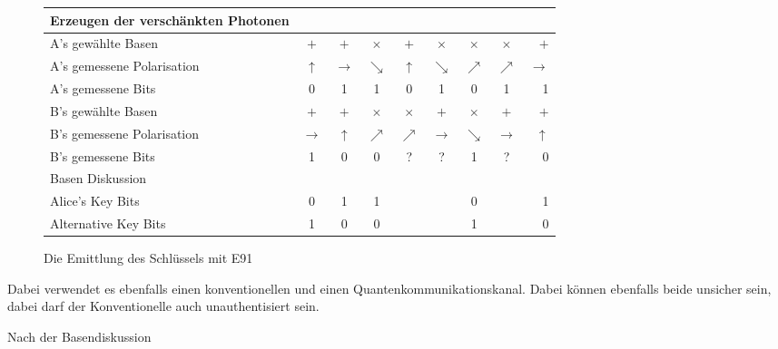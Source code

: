   \begin{figure}
  \centering
    \begin{tabular}{ l || c | c | c | c | c | c | c | r }
      \hline
      Erzeugen der versch\"ankten Photonen \\
      \hline
      A's gew\"ahlte Basen & $+$ & $+$ & $\times $ & $+$ & $\times $ & $\times $ & $\times $ & $+$ \\
      \hline
      A's gemessene Polarisation & $\uparrow$ & $\rightarrow$ & $\searrow$ & $\uparrow$ & $\searrow$ &     $\nearrow$ & $\nearrow$ & $\rightarrow$ \\
      \hline
      A's gemessene Bits & 0 & 1 & 1 & 0 & 1 & 0 & 1 & 1 \\
      \hline
      B's gew\"ahlte Basen & $+$ & $+$ & $\times $ & $\times $ & $+$ & $\times $ & $+$ & $+$ \\
      \hline
      B's gemessene Polarisation & $\rightarrow$ & $\uparrow$ & $\nearrow$ & $\nearrow$ & $\rightarrow$     & $\searrow$ & $\rightarrow$ & $\uparrow$ \\
      \hline
      B's gemessene Bits & 1 & 0 & 0 & ? & ? & 1 & ? & 0 \\
      \hline
      Basen Diskussion \\
      \hline
      Alice's Key Bits & 0 & 1 & 1 & & & 0 & & 1 \\
      Alternative Key Bits & 1 & 0 & 0 & & & 1 & & 0 \\
      \hline
    \end{tabular}
    \caption{Die Emittlung des Schl\"ussels mit E91 \label{crypto:tangtab}}
  \end{figure}

  Dabei verwendet es ebenfalls einen konventionellen und einen Quantenkommunikationskanal.
  Dabei k\"onnen ebenfalls beide unsicher sein, dabei darf der Konventionelle auch unauthentisiert sein.



  Nach der Basendiskussion

